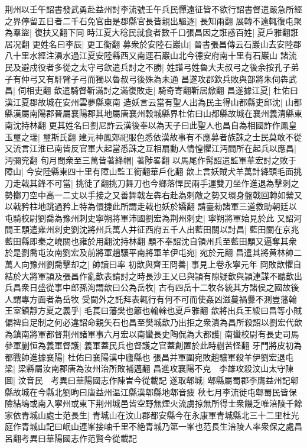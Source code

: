 荆州以壬午詔書發武勇赴益州討李流號壬午兵民憚遠征皆不欲行詔書督遣嚴急所經之界停留五日者二千石免官由是郡縣官長皆親出驅逐|{
	長知兩翻}
展轉不遠輒復屯聚為羣盜|{
	復扶又翻下同}
時江夏大稔民就食者數千口張昌因之誑惑百姓|{
	夏戶雅翻誑居况翻}
更姓名曰李辰|{
	更工衡翻}
募衆於安陸石巖山|{
	晉書張昌傳云石巖山去安陸郡八十里水經注溳水過江夏安陸縣西又南逕石巖山北今德安府南十里有石巖山}
諸流民及避戍役者多從之太守弓欽遣兵討之不勝|{
	姓譜弓姓魯大夫叔弓之後余按孔子弟子有仲弓又有馯臂子弓而獨以魯叔弓後殊為未通}
昌遂攻郡欽兵敗與部將朱伺犇武昌|{
	伺相吏翻}
歆遣騎督靳滿討之滿復敗走|{
	騎奇寄翻靳居焮翻}
昌遂據江夏|{
	杜佑曰漢江夏郡故城在安州雲夢縣柬南}
造妖言云當有聖人出為民主得山都縣吏邱沈|{
	山都縣漢屬南陽郡晉屬襄陽郡其地屬唐襄州穀城縣界杜佑曰山都縣故城在襄州義清縣東南沈持林翻}
更其姓名曰劉尼詐云漢後奉以為天子曰此聖人也昌自為相國詐作鳳皇玉璽之瑞|{
	璽斯氏翻}
建元神鳳郊祀服色悉依漢故事有不應募者族誅之士民莫敢不從又流言江淮已南皆反官軍大起當悉誅之互相扇動人情惶懼江沔間所在起兵以應昌|{
	沔彌兖翻}
旬月間衆至三萬皆著絳㡌|{
	著陟畧翻}
以馬尾作髯詔遣監軍華宏討之敗于障山|{
	今安陸縣東四十里有障山監工銜翻華戶化翻}
歆上言妖賊犬羊萬計絳頭毛面挑刀走戟其鋒不可當|{
	挑徒了翻挑刀舞刀也今鄉落悍民兩手運雙刀坐作進退為擊刺之勢擲刀空中高一二丈以手接之又善舞戟左犇右赴為刺敵之勢又環身盤戟回轉如縈又以戟矜柱地跳過矜上特為儇捷此所謂走戟也妖於嬌翻}
請臺勑諸軍三道救助朝廷以屯騎校尉劉喬為豫州刺史寧朔將軍沛國劉宏為荆州刺史|{
	寧朔將軍始見於此}
又詔河間王顒遣雍州刺史劉沈將州兵萬人并征西府五千人出藍田關以討昌|{
	藍田關在京兆藍田縣即秦之嶢關也雍於用翻沈持林翻}
顒不奉詔沈自領州兵至藍田顒又逼奪其衆於是劉喬屯汝南劉宏及前將軍趙驤平南將軍羊伊屯宛|{
	宛於元翻}
昌遣其將黄林帥二萬人向豫州劉喬擊却之|{
	帥讀曰率}
初歆與齊王冏善|{
	事見上卷永寧元年}
冏敗歆懼自結於大將軍頴及張昌作亂歆表請討之時長沙王乂已與頴有隙疑歆與頴連謀不聽歆出兵昌衆日盛從事中郎孫洵謂歆曰公為岳牧|{
	古有四岳十二牧各統其方諸侯之國故後人謂專方面者為岳牧}
受閫外之託拜表輒行有何不可而使姦凶滋蔓禍釁不測豈藩翰王室鎮靜方夏之義乎|{
	毛萇曰藩樊也籬也翰榦也夏戶雅翻}
歆將出兵王綏曰昌等小賊偏禆自足制之何必違詔命親矢石也昌至樊城歆乃出拒之衆潰為昌所殺詔以劉宏代歆為鎮南將軍都督荆州諸軍事六月宏以南蠻長史陶侃為大都護|{
	南蠻校尉有長史司馬}
參軍蒯恒為義軍督護|{
	義軍蓋民兵也督護之官蓋創置於此時蒯苦怪翻}
牙門將皮初為都戰帥進據襄陽|{
	杜佑曰襄陽漢中廬縣也}
張昌并軍圍宛敗趙驤軍殺羊伊劉宏退屯梁|{
	梁縣屬汝南郡唐為汝州治所敗補邁翻}
昌進攻襄陽不克　李雄攻殺汶山太守陳圖|{
	汶音民　考異曰華陽國志作陳旹今從載記}
遂取郫城|{
	郫縣屬蜀郡李膺益州記郫縣故城在今縣北劉昫曰唐益州温江縣漢郫縣地郫音疲}
秋七月李流徙屯郫蜀民皆保險結塢或南入寧州或東下荆州城邑皆空野無煙火流虜掠無所得士衆饑乏唯涪陵千餘家依青城山處士范長生|{
	青城山在汶山郡都安縣今在永康軍青城縣北三十二里杜光庭作青城山記曰岷山連峯接岫千里不絶青城乃第一峯也范長生涪陵人率衆保之處昌呂翻考異曰華陽國志作范賢今從載記}
